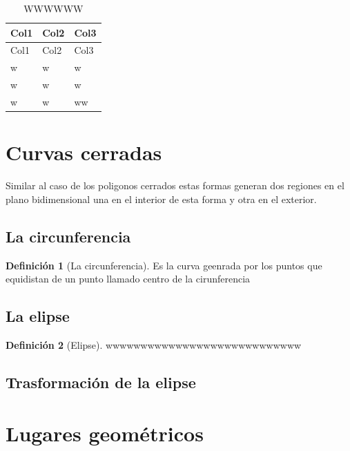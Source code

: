 \documentclass[16pt,]{krantz}
\theoremstyle{definition}
\newtheorem{definition}{Definición}[chapter]
\theoremstyle{definition}
\theoremstyle{definition}
\theoremstyle{definition}
\theoremstyle{remark}
\begin{document}
\begin{longtable}[]{@{}lll@{}}
\caption{\label{tab:regular} WWWWWW}\tabularnewline
\toprule
Col1 & Col2 & Col3\tabularnewline
\midrule
\endfirsthead
\toprule
Col1 & Col2 & Col3\tabularnewline
\midrule
\endhead
w & w & w\tabularnewline
w & w & w\tabularnewline
w & w & ww\tabularnewline
\bottomrule
\end{longtable}

\hypertarget{curvas-cerradas}{%
\section{Curvas cerradas}\label{curvas-cerradas}}

Similar al caso de los poligonos cerrados estas formas generan dos regiones en el plano bidimensional una en el interior de esta forma y otra en el exterior.

\hypertarget{la-circunferencia}{%
\subsection{La circunferencia}\label{la-circunferencia}}

\begin{definition}[La circunferencia]
\protect\hypertarget{def:circulo}{}{\label{def:circulo} {} }Es la curva geenrada por los puntos que equidistan de un punto llamado centro de la cirunferencia
\end{definition}

\hypertarget{la-elipse}{%
\subsection{La elipse}\label{la-elipse}}

\begin{definition}[Elipse]
\protect\hypertarget{def:elipse}{}{\label{def:elipse} {} }wwwwwwwwwwwwwwwwwwwwwwwwwwww
\end{definition}

\hypertarget{trasformaciuxf3n-de-la-elipse}{%
\subsection{Trasformación de la elipse}\label{trasformaciuxf3n-de-la-elipse}}

\hypertarget{lugares-geomuxe9tricos}{%
\section{Lugares geométricos}\label{lugares-geomuxe9tricos}}
\end{document}
